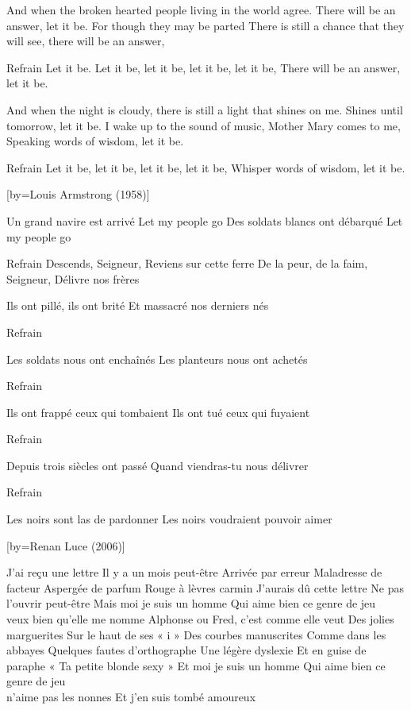 \beginverse
And when the broken hearted people living in the world agree.
There will be an answer, let it be.
For though they may be parted
There is still a chance that they will see, there will be an answer,
\endverse

\beginverse
Refrain
Let it be. Let it be, let it be, let it be, let it be,
There will be an answer, let it be.
\endverse

\beginverse
And when the night is cloudy, there is still a light that shines on me.
Shines until tomorrow, let it be.
I wake up to the sound of music, Mother Mary comes to me,
Speaking words of wisdom, let it be.
\endverse

\beginverse
Refrain
Let it be, let it be, let it be, let it be,
Whisper words of wisdom, let it be.
\endverse

[by={Louis Armstrong (1958)}]

\beginverse
Un grand navire est arrivé
Let my people go
Des soldats blancs ont débarqué
Let my people go
\endverse

\beginverse
Refrain
Descends, Seigneur,
Reviens sur cette ferre
De la peur, de la faim, Seigneur,
Délivre nos frères \!
\endverse

\beginverse
Ils ont pillé, ils ont brité
Et massacré nos derniers nés
\endverse

\beginverse
Refrain
\endverse

\beginverse
Les soldats nous ont enchaînés
Les planteurs nous ont achetés
\endverse

\beginverse
Refrain
\endverse

\beginverse
Ils ont frappé ceux qui tombaient
Ils ont tué ceux qui fuyaient
\endverse

\beginverse
Refrain
\endverse

\beginverse
Depuis trois siècles ont passé
Quand viendras-tu nous délivrer
\endverse

\beginverse
Refrain
\endverse

\beginverse
Les noirs sont las de pardonner
Les noirs voudraient pouvoir aimer
\endverse

[by={Renan Luce (2006)}]

\beginverse
J'ai reçu une lettre
Il y a un mois peut-être
Arrivée par erreur
Maladresse de facteur
Aspergée de parfum
Rouge à lèvres carmin
J'aurais dû cette lettre
Ne pas l'ouvrir peut-être
Mais moi je suis un homme
Qui aime bien ce genre de jeu
\\[Je] veux bien qu'elle me nomme
Alphonse ou Fred, c'est comme elle veut
Des jolies marguerites
Sur le haut de ses « i »
Des courbes manuscrites
Comme dans les abbayes
Quelques fautes d'orthographe
Une légère dyslexie
Et en guise de paraphe
« Ta petite blonde sexy »
Et moi je suis un homme
Qui aime bien ce genre de jeu
\\[Je] n'aime pas les nonnes
Et j'en suis tombé amoureux
\endverse

